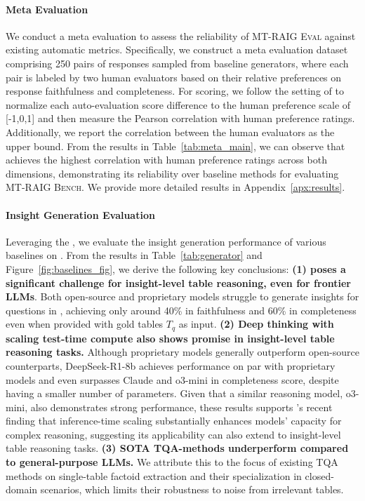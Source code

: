 


\paragraph{Meta Evaluation}
We conduct a meta evaluation to assess the reliability of \textsc{MT-RAIG Eval} against existing automatic metrics.
Specifically, we construct a meta evaluation dataset comprising 250 pairs of responses sampled from baseline generators, where each pair is labeled by two human evaluators based on their relative preferences on response faithfulness and completeness.
For scoring, we follow the setting of \citet{ru2024ragchecker} to normalize each auto-evaluation score difference to the human preference scale of [-1,0,1] and then measure the Pearson correlation with human preference ratings. 
Additionally, we report the correlation between the human evaluators as the upper bound. 
From the results in Table~\ref{tab:meta_main}, we can observe that \eval achieves the highest correlation with human preference ratings across both dimensions, demonstrating its reliability over baseline methods for evaluating \textsc{MT-RAIG Bench}. 
We provide more detailed results in Appendix~\ref{apx:results}. 




\paragraph{Insight Generation Evaluation}
Leveraging the \eval, we evaluate the insight generation performance of various baselines on \bench. 
From the results in Table~\ref{tab:generator} and Figure~\ref{fig:baselines_fig}, we derive the following key conclusions:
\textbf{(1) \bench poses a significant challenge for insight-level table reasoning, even for frontier LLMs}. Both open-source and proprietary models struggle to generate insights for questions in \bench, achieving only around 40\% in faithfulness and 60\% in completeness even when provided with gold tables $T_q$ as input.
\textbf{(2) Deep thinking with scaling test-time compute also shows promise in insight-level table reasoning tasks.}
Although proprietary models generally outperform open-source counterparts, DeepSeek-R1-8b achieves performance on par with proprietary models and even surpasses Claude and o3-mini in completeness score, despite having a smaller number of parameters.
Given that a similar reasoning model, o3-mini, also demonstrates strong performance, these results supports  \citet{testtimecompute, DeepSeekAI2025DeepSeekR1IR}'s recent finding
that inference-time scaling substantially enhances models' capacity for complex reasoning, suggesting its applicability can also extend to insight-level table reasoning tasks. 
\noindent \textbf{(3) SOTA TQA-methods underperform compared to general-purpose LLMs.}
We attribute this to the focus of existing TQA methods on single-table factoid extraction and their
specialization in closed-domain scenarios, which limits their robustness to noise from irrelevant tables. 


